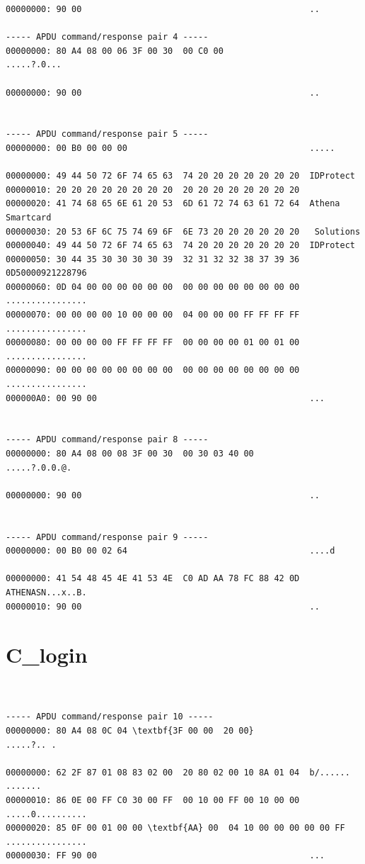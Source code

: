 \documentclass[bsc,frontabs,twoside,singlespacing,parskip,deptreport]{infthesis}     %
\begin{document}
\begin{appendices}
\begin{Verbatim}[commandchars=\\\{\}, fontsize=\small]
00000000: 90 00                                             ..

----- APDU command/response pair 4 -----
00000000: 80 A4 08 00 06 3F 00 30  00 C0 00                 .....?.0...

00000000: 90 00                                             ..


----- APDU command/response pair 5 -----
00000000: 00 B0 00 00 00                                    .....

00000000: 49 44 50 72 6F 74 65 63  74 20 20 20 20 20 20 20  IDProtect       
00000010: 20 20 20 20 20 20 20 20  20 20 20 20 20 20 20 20                  
00000020: 41 74 68 65 6E 61 20 53  6D 61 72 74 63 61 72 64  Athena Smartcard
00000030: 20 53 6F 6C 75 74 69 6F  6E 73 20 20 20 20 20 20   Solutions      
00000040: 49 44 50 72 6F 74 65 63  74 20 20 20 20 20 20 20  IDProtect       
00000050: 30 44 35 30 30 30 30 39  32 31 32 32 38 37 39 36  0D50000921228796
00000060: 0D 04 00 00 00 00 00 00  00 00 00 00 00 00 00 00  ................
00000070: 00 00 00 00 10 00 00 00  04 00 00 00 FF FF FF FF  ................
00000080: 00 00 00 00 FF FF FF FF  00 00 00 00 01 00 01 00  ................
00000090: 00 00 00 00 00 00 00 00  00 00 00 00 00 00 00 00  ................
000000A0: 00 90 00                                          ...


----- APDU command/response pair 8 -----
00000000: 80 A4 08 00 08 3F 00 30  00 30 03 40 00           .....?.0.0.@.

00000000: 90 00                                             ..


----- APDU command/response pair 9 -----
00000000: 00 B0 00 02 64                                    ....d

00000000: 41 54 48 45 4E 41 53 4E  C0 AD AA 78 FC 88 42 0D  ATHENASN...x..B.
00000010: 90 00                                             ..

\end{Verbatim}

\section{C\_login}
\begin{Verbatim}[commandchars=\\\{\}, fontsize=\small]


----- APDU command/response pair 10 -----
00000000: 80 A4 08 0C 04 \textbf{3F 00 00  20 00}                    .....?.. .

00000000: 62 2F 87 01 08 83 02 00  20 80 02 00 10 8A 01 04  b/...... .......
00000010: 86 0E 00 FF C0 30 00 FF  00 10 00 FF 00 10 00 00  .....0..........
00000020: 85 0F 00 01 00 00 \textbf{AA} 00  04 10 00 00 00 00 00 FF  ................
00000030: FF 90 00                                          ...


\end{Verbatim}
\end{appendices}
\end{document}
